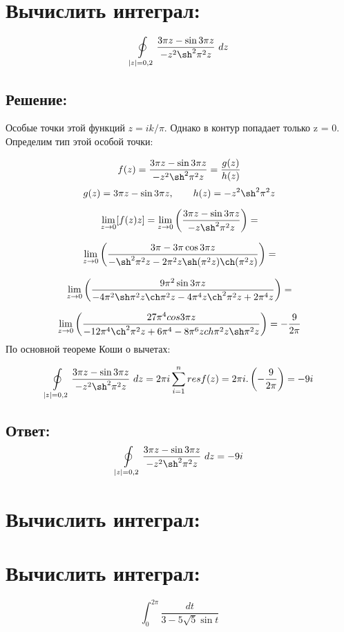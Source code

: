 \documentclass{article}
\begin{document}
	\section{Вычислить интеграл: }
	\[
		\ointop_{|z| =0,2}\frac{3\pi z - \sin{3\pi z}}{-z^{2}\sh^{2}\pi^{2}z}\ dz
	\]
	\subsection{Решение:}
	\raggedright Особые точки этой функций $z =ik/\pi$. Однако в контур попадает
	только z = 0. Определим тип этой особой точки:
	\newline
	\raggedright
	\[
		f(z) = \frac{3\pi z - \sin{3\pi z}}{-z^{2}\sh^{2}\pi^{2}z}= \frac{g(z)}{h(z)}
	\]
	\[
		g(z) = 3\pi z - \sin{3\pi z}, \quad \quad h(z) = -z^{2}\sh^{2}\pi^{2}z
	\]

	\[
		\lim\limits_{z\rightarrow 0}[f(z)z] = \lim\limits_{z\rightarrow 0}\left(\frac{3\pi
		z - \sin{3\pi z}}{-z\sh^{2}\pi^{2}z}\right) =
	\]

	\[
		\lim\limits_{z\rightarrow 0}\left(\frac{3\pi - 3\pi\cos{3\pi z }}{-\sh^{2}\pi^{2}z
		- 2\pi^{2}z\sh(\pi^{2}z)\ch(\pi^{2}z)}\right) =
	\]

	\[
		\lim\limits_{z\rightarrow 0}\left(\frac{9\pi^{2}\sin{3\pi z}}{-4\pi^{2}\sh\pi^{2}z\ch\pi^{2}z
		- 4\pi^{4}z\ch^{2}\pi^{2}z + 2\pi^{4}z}\right) =
	\]

	\[
		\lim\limits_{z\rightarrow 0}\left(\frac{27\pi^{4}cos{3\pi z}}{-12\pi^{4}\ch^{2}\pi^{2}z
		+ 6\pi^{4}-8\pi^{6}zch\pi^{2}z\sh\pi^{2}z}\right) = -\frac{9}{2\pi}
	\]
	\newline
	По основной теореме Коши о вычетах:

	\[
		\ointop_{|z| =0,2}\frac{3\pi z - \sin{3\pi z}}{-z^{2}\sh^{2}\pi^{2}z}\ dz = 2
		\pi i \sum\limits_{i=1}^{n}resf(z) = 2\pi i. \left(-\frac{9}{2\pi}\right) = -
		9i
	\]

	\subsection{Ответ:
	\[
		\ointop_{|z| =0,2}\frac{3\pi z - \sin{3\pi z}}{-z^{2}\sh^{2}\pi^{2}z}\ dz = -
		9i
	\]
	}

	\vspace{1.5cm}

	\section{Вычислить интеграл: }

	\section{Вычислить интеграл: }
	\[
		\int_{0}^{2\pi}\frac{dt}{3 - 5\sqrt{5}\sin{t}}
	\]
\end{document}
